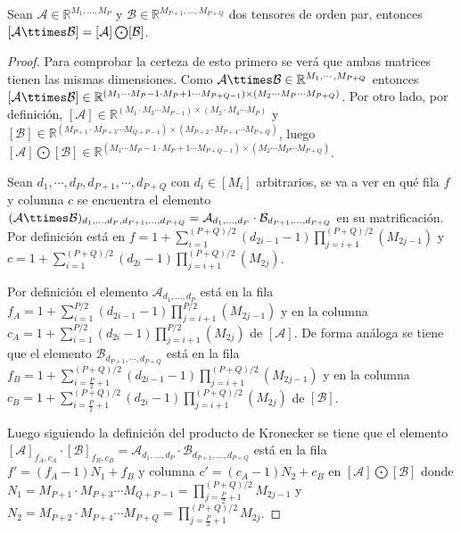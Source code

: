 \begin{prop} \label{prop:kroneckermatrificacion}
Sean $\mathcal{A} \in \mathbb{R}^{M_1,... ,M_P}$ y $\mathcal{B} \in \mathbb{R}^{M_{P+1},... ,M_{P+Q}}$ dos tensores de orden par, entonces $[\mathcal{A}\ttimes \mathcal{B}] = [\mathcal{A}] \bigodot [\mathcal{B}]$.
\end{prop}
\begin{proof}
Para comprobar la certeza de esto primero se verá que ambas matrices tienen las mismas dimensiones. Como $\mathcal{A}\ttimes \mathcal{B}\in\mathbb{R}^{M_1,\cdots ,M_{P+Q}}$ entonces \\ $[\mathcal{A}\ttimes \mathcal{B}]\in\mathbb{R}^{(M_1 \cdots M_P-1 \cdot M_P+1 \cdots  M_{P+Q-1}) \times (M_2 \cdots   M_P  \cdots   M_{P+Q})}$. Por otro lado, por definición, $[\mathcal{A}]\in\mathbb{R}^{(M_1\cdot M_3 \cdots  M_{P-1})\times(M_2\cdot M_4 \cdots  M_{P})}$ y $[\mathcal{B}]\in\mathbb{R}^{(M_{P+1}\cdot M_{P+3} \cdots  M_{Q+P-1})\times(M_{P+2}\cdot M_{P+4} \cdots  M_{P+Q})}$, luego  $[\mathcal{A}] \bigodot [\mathcal{B}]\in\mathbb{R}^{(M_1 \cdots   M_P-1 \cdot M_P+1  \cdots   M_{P+Q-1}) \times (M_2 \cdots   M_P  \cdots   M_{P+Q})}$. 

Sean $d_1,\cdots ,d_P,d_{P+1},\cdots ,d_{P+Q}$ con $d_i\in[M_i]$ arbitrarios, se va a ver en qué fila $f$ y columna $c$ se encuentra el elemento $(\mathcal{A}\ttimes \mathcal{B})_{d_1,... ,d_P,d_{P+1},... ,d_{P+Q}} = \mathcal{A}_{d_1,... ,d_P}  \cdot \mathcal{B}_{d_{P+1},... ,d_{P+Q}}$ en su matrificación. Por definición está en $f = 1+\sum_{i=1}^{(P+Q)/2}(d_{2i-1}-1)\prod_{j=i+1}^{(P+Q)/2}(M_{2j-1})$ y $c = 1+\sum_{i=1}^{(P+Q)/2}(d_{2i}-1)\prod_{j=i+1}^{(P+Q)/2}(M_{2j})$.


Por definición el elemento $\mathcal{A}_{d_1,... ,d_P}$ está en la fila $f_A=1+\sum_{i=1}^{P/2}(d_{2i-1}-1)\prod_{j=i+1}^{P/2}(M_{2j-1})$ y en la columna $c_A = 1+\sum_{i=1}^{P/2}(d_{2i}-1)\prod_{j=i+1}^{P/2}(M_{2j})$ de $[\mathcal{A}]$. De forma análoga se tiene que el elemento $\mathcal{B}_{d_{P+1},\cdots ,d_{P+Q}}$ está en la fila $f_B=1+\sum_{i=\frac{P}{2}+1}^{(P+Q)/2}(d_{2i-1}-1)\prod_{j=i+1}^{(P+Q)/2}(M_{2j-1})$ y en la columna $c_B = 1+\sum_{i=\frac{P}{2}+1}^{(P+Q)/2}(d_{2i}-1)\prod_{j=i+1}^{(P+Q)/2}(M_{2j})$ de $[\mathcal{B}]$. 

Luego siguiendo la definición del producto de Kronecker se tiene que el elemento \\ $[\mathcal{A}]_{f_A,c_A}\cdot[\mathcal{B}]_{f_B,c_B} =  \mathcal{A}_{d_1,... ,d_P} \cdot \mathcal{B}_{d_{P+1},... ,d_{P+Q}}$ está en la fila $f'=(f_A-1)N_1+f_B$ y columna $c'=(c_A-1)N_2+c_B$ en $[\mathcal{A}]\bigodot [\mathcal{B}]$ donde $N_1 = M_{P+1}\cdot M_{P+3} \cdots  M_{Q+P-1} = \prod_{j = \frac{P}{2} + 1}^{(P+Q)/2}M_{2j-1}$ y $N_2 = M_{P+2}\cdot M_{P+4} \cdots  M_{P+Q} = \prod_{j = \frac{P}{2} + 1}^{(P+Q)/2}M_{2j}$.


\end{proof}
